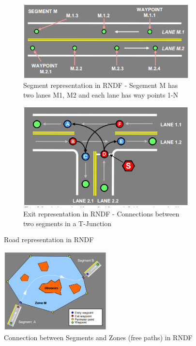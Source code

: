 \begin{figure}
	\centering
	\begin{subfigure}{.55\textwidth}
	    \centering
		\includegraphics[width=1.0\textwidth]{Images/rndf_segment.png}
		\caption{Segment representation in RNDF - Segement M has two lanes M1, M2 and each lane has way points 1-N}
		\label{rndf_segment}
	\end{subfigure}\hspace{.01\textwidth}
	\begin{subfigure}{.43\textwidth}
		\centering
		\includegraphics[width=1.0\textwidth]{Images/rndf_exits.png}
		\caption{Exit representation in RNDF - Connections between two segments in a T-Junction}
		\label{rndf_exits}
	\end{subfigure}
	\caption{Road representation in RNDF \cite{rndf_darpa}}
	\label{rndf_seg_exit}
\end{figure}

\begin{figure}
    \centering
    \includegraphics[width=0.5\textwidth]{Images/zone_segment.png}
    \caption{Connection between Segments and Zones (free paths) in RNDF \cite{rndf_darpa}}
    \label{zone_segment}
\end{figure}


